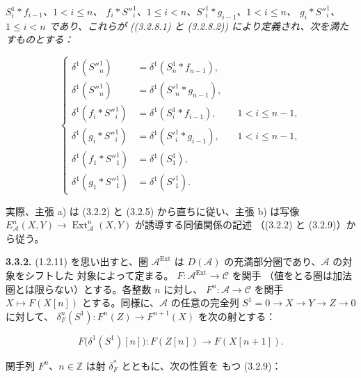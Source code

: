 \clearpage
{}%
\begingroup\small\setlength{\parskip}{0pt}\setlength{\emergencystretch}{1.5em}
\setlength{\abovedisplayskip}{4pt plus 2pt minus 2pt}%
\setlength{\belowdisplayskip}{4pt plus 2pt minus 2pt}%

\noindent\textit{$S_i^1*f_{i-1}$、$1<i\leq n$、
$f_i*{S''}_i^1$、$1\leq i<n$、${S'}_i^1*g_{i-1}$、$1<i\leq n$、
$g_i*{S''}_i^1$、$1\leq i<n$ であり、これらが ((3.2.8.1) と
(3.2.8.2)) により定義され、次を満たすものとする：}

\begin{equation}
\left\{
\begin{aligned}
\delta^1({S''}_n^1)
  &=\delta^1(S_n^1*f_{n-1}),\\
\delta^1({S''}_n^1)
  &=\delta^1({S'}_n^1*g_{n-1}),\\
\delta^1(f_i*{S''}_i^1)
  &=\delta^1(S_i^1*f_{i-1}),&&1<i\leq n-1,\\
\delta^1(g_i*{S''}_i^1)
  &=\delta^1({S'}_i^1*g_{i-1}),&&1<i\leq n-1,\\
\delta^1(f_1*{S''}_1^1)
  &=\delta^1(S_1^1),\\
\delta^1(g_1*{S''}_1^1)
  &=\delta^1({S'}_1^1).
\end{aligned}
\right.
\tag{3.3.1.2}
\end{equation}

実際、主張 a) は (3.2.2) と (3.2.5) から直ちに従い、主張 b) は写像
$E_{\mathcal A}^{n}(X,Y)\longrightarrow
\operatorname{Ext}_{\mathcal A}^{n}(X,Y)$ が誘導する同値関係の記述
（(3.2.2) と (3.2.9)）から従う。

\medskip\noindent\textbf{3.3.2.}\quad
(1.2.11) を思い出すと、圏 $\mathcal A^{\operatorname{Ext}}$ は
$D(\mathcal A)$ の充満部分圏であり、$\mathcal A$ の対象をシフトした
対象によって定まる。
$F\colon\mathcal A^{\operatorname{Ext}}\longrightarrow\mathcal C$ を関手
（値をとる圏は加法圏とは限らない）とする。各整数 $n$ に対し、
$F^n\colon\mathcal A\longrightarrow\mathcal C$ を関手
$X\longmapsto F(X[n])$ とする。同様に、$\mathcal A$ の任意の完全列
$S^1=0\longrightarrow X\longrightarrow Y\longrightarrow Z
\longrightarrow0$ に対して、
$\delta_F^n(S^1)\colon F^n(Z)\longrightarrow F^{n+1}(X)$ を次の射とする：

\[
F\bigl(\delta^1(S^1)[n]\bigr)
\colon F(Z[n])\longrightarrow F(X[n+1]).
\]

関手列 $F^n$、$n\in\mathbb Z$ は射 $\delta_F^\ast$ とともに、次の性質を
もつ (3.2.9)：

